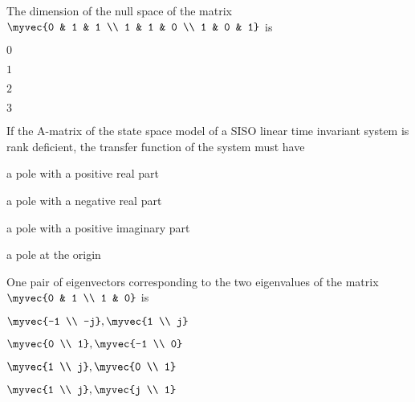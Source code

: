 \item The dimension of the null space of the matrix $\myvec{0 & 1 & 1 \\ 1 & 1 & 0 \\ 1 & 0 & 1}$ is
 \hfill{}
    \begin{enumerate}
    \begin{multicols}{4}
    \item $0$
    \item $1$
    \item $2$
    \item $3$
    \end{multicols}
    \end{enumerate}
%
\item If the A-matrix of the state space model of a SISO linear time invariant system is rank deficient, the transfer function of the system must have
 \hfill{}
    \begin{enumerate}
    \begin{multicols}{2}
    \item a pole with a positive real part
    \item a pole with a negative real part
    \item a pole with a positive imaginary part
    \item a pole at the origin
    \end{multicols}
    \end{enumerate}
\item One pair of eigenvectors corresponding to the two eigenvalues of the matrix $\myvec{0 & 1 \\ 1 & 0}$ is  
 \hfill{}
\begin{enumerate}
\begin{multicols}{4}
\item $\myvec{-1 \\ -j}, \myvec{1 \\ j}$
\item $\myvec{0 \\ 1}, \myvec{-1 \\ 0}$
\item $\myvec{1 \\ j}, \myvec{0 \\ 1}$
\item $\myvec{1 \\ j}, \myvec{j \\ 1}$
\end{multicols}
\end{enumerate}
